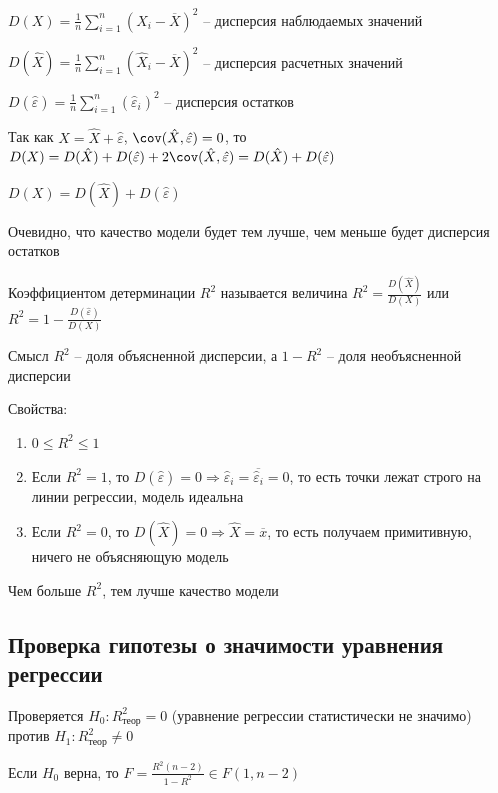 \Def $D(X) = \frac{1}{n} \sum_{i = 1}^n (X_i - \overline{X})^2$ -- дисперсия наблюдаемых значений

\Defs $D(\hat X) = \frac{1}{n} \sum_{i = 1}^n (\hat X_i - \overline{X})^2$ -- дисперсия расчетных значений

\Defs $D(\hat \varepsilon) = \frac{1}{n} \sum_{i = 1}^n (\hat \varepsilon_i)^2$ -- дисперсия остатков

Так как $X = \hat X + \hat \varepsilon$, $\cov (\hat X, \hat \varepsilon) = 0$, то $D(X) = D(\hat X) + D(\hat \varepsilon) + 2\cov (\hat X, \hat \varepsilon) = D(\hat X) + D(\hat \varepsilon)$

\begin{MyTheorem}
    \Ths $D(X) = D(\hat X) + D(\hat \varepsilon)$
\end{MyTheorem}

Очевидно, что качество модели будет тем лучше, чем меньше будет дисперсия остатков

\Def Коэффициентом детерминации $R^2$ называется величина $R^2 = \frac{D(\hat X)}{D(X)}$ или $R^2 = 1 - \frac{D(\hat \varepsilon)}{D(X)}$

\Notas Смысл $R^2$ -- доля объясненной дисперсии, а $1 - R^2$ -- доля необъясненной дисперсии

Свойства: 

\begin{enumerate}
    \item $0 \leq R^2 \leq 1$
    \item Если $R^2 = 1$, то $D(\hat \varepsilon) = 0 \Longrightarrow \hat \varepsilon_i = \overline{\hat \varepsilon_i} = 0$, то есть точки лежат строго на 
    линии регрессии, модель идеальна

    \item Если $R^2 = 0$, то $D(\hat X) = 0 \Longrightarrow \hat X = \overline{x}$, то есть получаем примитивную, ничего не объясняющую модель
\end{enumerate}

Чем больше $R^2$, тем лучше качество модели

\subsection{Проверка гипотезы о значимости уравнения регрессии}

Проверяется $H_0 : R^2_\text{теор} = 0$ (уравнение регрессии статистически не значимо) против $H_1 : R^2_\text{теор} \neq 0$

\begin{MyTheorem}
    \Ths Если $H_0$ верна, то $F = \frac{R^2 (n - 2)}{1 - R^2} \in F(1, n - 2)$
\end{MyTheorem}

